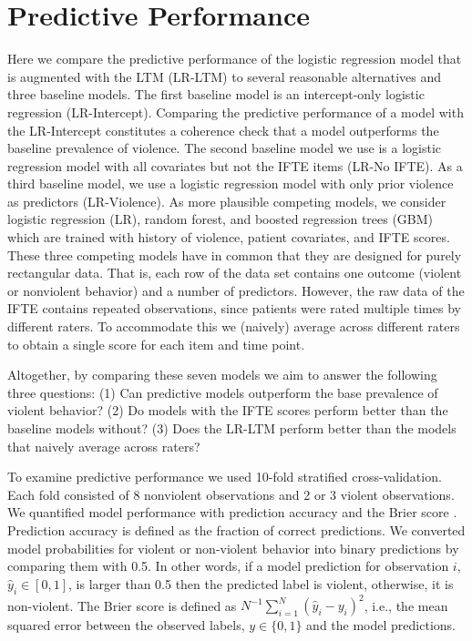 \documentclass[a4paper,11pt]{article}
\begin{document}

\section{Predictive Performance}

Here we compare the predictive performance of the logistic regression model that is augmented with the LTM (LR-LTM) to several reasonable alternatives and three baseline models.
The first baseline model is an intercept-only logistic regression (LR-Intercept). 
Comparing the predictive performance of a model with the LR-Intercept constitutes a coherence check that a model outperforms the baseline prevalence of violence.
The second baseline model we use is a logistic regression model with all covariates but not the IFTE items (LR-No IFTE).
As a third baseline model, we use a logistic regression model with only prior violence as predictors (LR-Violence).
As more plausible competing models, we consider logistic regression (LR), random forest, and boosted regression trees (GBM) which are trained with history of violence, patient covariates, and IFTE scores.
These three competing models have in common that they are designed for purely rectangular data.
That is, each row of the data set contains one outcome (violent or nonviolent behavior) and a number of predictors.
However, the raw data of the IFTE contains repeated observations, since patients were rated multiple times by different raters.
To accommodate this we (naively) average across different raters to obtain a single score for each item and time point.

Altogether, by comparing these seven models we aim to answer the following three questions: (1) Can predictive models outperform the base prevalence of violent behavior? (2) Do models with the IFTE scores perform better than the baseline models without? (3) Does the LR-LTM perform better than the models that naively average across raters?

To examine predictive performance we used 10-fold stratified cross-validation.
Each fold consisted of 8 nonviolent observations and 2 or 3 violent observations.
We quantified model performance with prediction accuracy and the Brier score \parencite{brier1950verification}.
Prediction accuracy is defined as the fraction of correct predictions.
We converted model probabilities for violent or non-violent behavior into binary predictions by comparing them with 0.5.
In other words, if a model prediction for observation $i$, $\hat{y}_i\in [0, 1]$, is larger than 0.5 then the predicted label is violent, otherwise, it is non-violent.
The Brier score is defined as $N^{-1}\sum_{i=1}^N\left(\hat{y}_i-y_{i}\right)^2$, i.e., the mean squared error between the observed labels, $y\in\{0,1\}$ and the model predictions.
\end{document}
